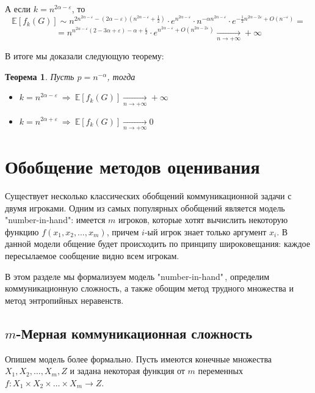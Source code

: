 \documentclass[a4paper]{article}
\newtheorem*{mtheorem}{Теорема}
\begin{document}
	А если $k = n^{2\alpha - \varepsilon}$, то $$\mathbb{E}[f_k(G)] \sim n^{2n^{2\alpha - \varepsilon} - 
	(2\alpha - \varepsilon)(n^{2\alpha - \varepsilon} + \frac{1}{2})}\cdot e^{n^{2\alpha - \varepsilon}}\cdot 
	n^{-\alpha n^{2\alpha-\varepsilon}}\cdot e^{-\frac{1}{2}n^{2\alpha - 2\varepsilon} + O\left(n^{-\varepsilon}\right)} = $$
	$$ = n^{n^{2\alpha - \varepsilon}(2 - 3\alpha +\varepsilon) - \alpha + \frac{\varepsilon}{2}}\cdot 
	e^{n^{2\alpha - \varepsilon}+O(n^{2\alpha - 2\varepsilon})}\xrightarrow[n \to +\infty]{} +\infty$$

	В итоге мы доказали следующую теорему:
	\begin{mtheorem}
	    Пусть $p = n^{-\alpha}$, тогда 
	    \begin{itemize}[noitemsep]
	        \item $k = n^{2\alpha - \varepsilon}\ \Longrightarrow\ \mathbb{E}[f_k(G)]\xrightarrow[n \to +\infty]{} +\infty$
	        \item $k = n^{2\alpha + \varepsilon}\ \Longrightarrow\ \mathbb{E}[f_k(G)]\xrightarrow[n \to +\infty]{} 0$
	    \end{itemize}
	\end{mtheorem}

\addtocounter{section}{1}
\section*{Обобщение методов оценивания}
Существует несколько классических обобщений коммуникационной задачи с двумя игроками. Одним из самых 
популярных обобщений является модель "number-in-hand": имеется $m$ игроков, которые хотят вычислить 
некоторую функцию $f(x_1,x_2,\ldots,x_m)$, причем $i$-ый игрок знает только аргумент $x_i$. В данной модели 
общение будет происходить по принципу широковещания: каждое пересылаемое сообщение видно всем игрокам.

В этом разделе мы формализуем модель "number-in-hand"\,, определим коммуникационную сложность, а также 
обощим метод трудного множества и метод энтропийных неравенств.

\setcounter{subsection}{0}
\subsection{$m$-Мерная коммуникационная сложность}

Опишем модель более формально. Пусть имеются конечные множества $X_1, X_2, \ldots, X_m, Z$ и задана
некоторая функция от $m$ переменных $f:X_1\times X_2\times \ldots\times X_m\rightarrow Z$.
\end{document}
